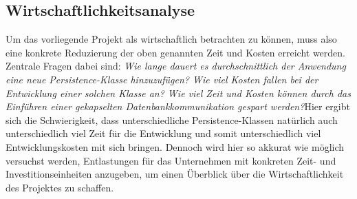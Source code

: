 \documentclass[11pt,toc=sectionentrywithoutdots, 
headheight=44pt, headings=optiontoheadandtoc, hyperfootnotes=false, hypertexnames=false]{scrartcl}
\begin{document}
\subsection{Wirtschaftlichkeitsanalyse}
Um das vorliegende Projekt als wirtschaftlich betrachten zu können, muss also eine konkrete Reduzierung der oben genannten Zeit und Kosten erreicht werden. Zentrale Fragen dabei sind: \textit{Wie lange dauert es durchschnittlich der Anwendung eine neue Persistence-Klasse hinzuzufügen? Wie viel Kosten fallen bei der Entwicklung einer solchen Klasse an? Wie viel Zeit und Kosten können durch das Einführen einer gekapselten Datenbankkommunikation gespart werden?}\newline Hier ergibt sich die Schwierigkeit, dass unterschiedliche Persistence-Klassen natürlich auch unterschiedlich viel Zeit für die Entwicklung und somit unterschiedlich viel Entwicklungskosten mit sich bringen. Dennoch wird hier so akkurat wie möglich versuchst werden, Entlastungen für das Unternehmen mit konkreten Zeit- und Investitionseinheiten anzugeben, um einen Überblick über die Wirtschaftlichkeit des Projektes zu schaffen.




\end{document}

